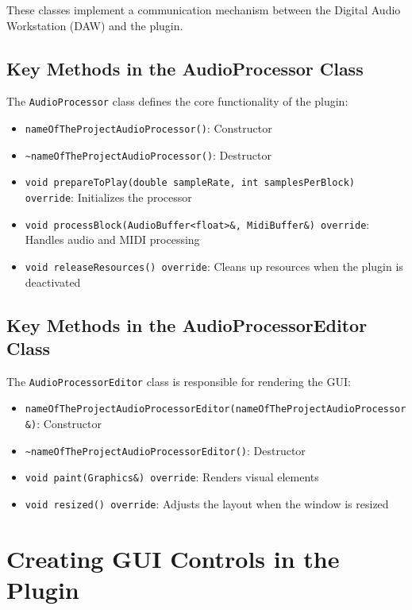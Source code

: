 These classes implement a communication mechanism between the Digital Audio Workstation (DAW) and the plugin.

\subsection{Key Methods in the AudioProcessor Class}

The \texttt{AudioProcessor} class defines the core functionality of the plugin:

\begin{itemize}
    \item \texttt{nameOfTheProjectAudioProcessor()}: Constructor
    \item \texttt{\textasciitilde nameOfTheProjectAudioProcessor()}: Destructor
    \item \texttt{void prepareToPlay(double sampleRate, int samplesPerBlock) override}: Initializes the processor
    \item \texttt{void processBlock(AudioBuffer<float>\&, MidiBuffer\&) override}: Handles audio and MIDI processing
    \item \texttt{void releaseResources() override}: Cleans up resources when the plugin is deactivated
\end{itemize}

\subsection{Key Methods in the AudioProcessorEditor Class}

The \texttt{AudioProcessorEditor} class is responsible for rendering the GUI:

\begin{itemize}
    \item \texttt{nameOfTheProjectAudioProcessorEditor(nameOfTheProjectAudioProcessor\&)}: Constructor
    \item \texttt{\textasciitilde nameOfTheProjectAudioProcessorEditor()}: Destructor
    \item \texttt{void paint(Graphics\&) override}: Renders visual elements
    \item \texttt{void resized() override}: Adjusts the layout when the window is resized
\end{itemize}

\section{Creating GUI Controls in the Plugin}

